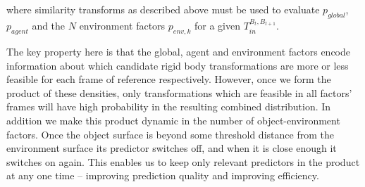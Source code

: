 \noindent where similarity transforms as described above must be used to evaluate $p_{global}$, $p_{agent}$ and the $N$ environment factors $p_{env,k}$ for a given ${T}_{in}^{B_{t}, B_{t+1}}$.

The key property here is that the global, agent and environment factors encode information about which candidate rigid body transformations are more or less feasible for each frame of reference respectively. However, once we form the product of these densities, only transformations which are feasible in all factors' frames will have high probability in the resulting combined distribution. In addition we make this product dynamic in the number of object-environment factors. Once the object surface is beyond some threshold distance from the environment surface its predictor switches off, and when it is close enough it switches on again. This enables us to keep only relevant predictors in the product at any one time -- improving prediction quality and improving efficiency. 





